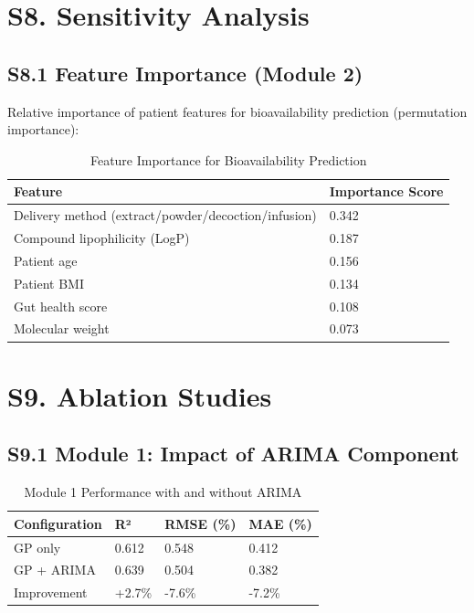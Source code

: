 \documentclass[11pt,a4paper]{article}
\begin{document}
\section{S8. Sensitivity Analysis}

\subsection{S8.1 Feature Importance (Module 2)}

Relative importance of patient features for bioavailability prediction (permutation importance):

\begin{table}[H]
\centering
\caption{Feature Importance for Bioavailability Prediction}
\label{tab:importance}
\begin{tabular}{|l|l|}
\hline
\textbf{Feature} & \textbf{Importance Score} \\
\hline
Delivery method (extract/powder/decoction/infusion) & 0.342 \\
\hline
Compound lipophilicity (LogP) & 0.187 \\
\hline
Patient age & 0.156 \\
\hline
Patient BMI & 0.134 \\
\hline
Gut health score & 0.108 \\
\hline
Molecular weight & 0.073 \\
\hline
\end{tabular}
\end{table}

\section{S9. Ablation Studies}

\subsection{S9.1 Module 1: Impact of ARIMA Component}

\begin{table}[H]
\centering
\caption{Module 1 Performance with and without ARIMA}
\label{tab:ablation_m1}
\begin{tabular}{|l|l|l|l|}
\hline
\textbf{Configuration} & \textbf{R²} & \textbf{RMSE (\%)} & \textbf{MAE (\%)} \\
\hline
GP only & 0.612 & 0.548 & 0.412 \\
\hline
GP + ARIMA & 0.639 & 0.504 & 0.382 \\
\hline
Improvement & +2.7\% & -7.6\% & -7.2\% \\
\hline
\end{tabular}
\end{table}
\end{document}
